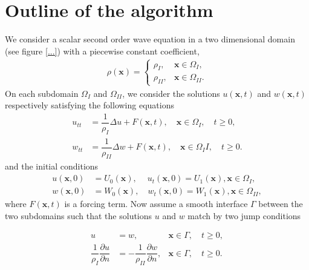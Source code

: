 \documentclass[10pt,a4paper,twoside, french]{article}
\numberwithin{equation}{section}
\numberwithin{figure}{section}
\numberwithin{table}{section}
\newcommand{\bx}{\mathbf{x}}
\begin{document}
\section{Outline of the algorithm}
We consider a scalar second order wave equation in a two dimensional domain (see figure \ref{...}) with a piecewise constant coefficient,
\begin{align*}
\rho(\bx)=\left\lbrace
\begin{array}{cc}
\rho_I, & \bx\in\Omega_I, \\
\rho_{II}, & \bx\in\Omega_{II}.
\end{array}
\right.
\end{align*}
On each subdomain $\Omega_I$ and $\Omega_{II}$, we consider the solutions $u(\bx,t)$ and $w(\bx,t)$ respectively satisfying the following equations
\begin{align}
u_{tt} &= \dfrac{1}{\rho_I}\Delta u+F(\bx,t), \quad \bx\in\Omega_I,\quad t\geq 0,\\
w_{tt} &= \dfrac{1}{\rho_{II}}\Delta w+F(\bx,t), \quad \bx\in\Omega_{I}I,\quad t\geq 0.
\end{align}
and the initial conditions
\begin{align}
u(\bx,0) &= U_0(\bx),\quad ~u_t(\bx,0)=U_1(\bx), \bx\in\Omega_I, \\
w(\bx,0) &= W_0(\bx),\quad w_t(\bx,0)=W_1(\bx), \bx\in\Omega_{II},
\end{align}
where $F(\bx,t)$ is a forcing term. Now assume a smooth interface $\Gamma$ between the two subdomains such that the solutions $u$ and $w$ match by two jump conditions
\begin{center}
\begin{minipage}[c]{.5\textwidth}
\begin{align}
u &= w, &\bx\in\Gamma, \quad t\geq 0, \\
\dfrac{1}{\rho_I}\dfrac{\partial u}{\partial n} &= -\dfrac{1}{\rho_{II}}\dfrac{\partial w}{\partial n}, &\bx\in\Gamma, \quad t\geq 0.
\end{align}
\end{minipage}
\end{center}

\begin{center}
\begin{minipage}[c]{0.5\textwidth}
\centering
{}
\end{minipage}
\end{center}
\end{document}
